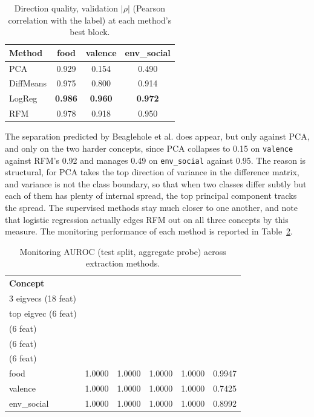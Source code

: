 \begin{table}[htbp]
\centering
\caption{Direction quality, validation $|\rho|$ (Pearson correlation with the label) at each method's best block.}
\label{tab:baselines_val_rho}
\begin{tabular}{@{}lccc@{}}
\toprule
\textbf{Method} & \textbf{food} & \textbf{valence} & \textbf{env\_social} \\
\midrule
PCA        & 0.929 & 0.154 & 0.490 \\
DiffMeans  & 0.975 & 0.800 & 0.914 \\
LogReg     & \textbf{0.986} & \textbf{0.960} & \textbf{0.972} \\
RFM        & 0.978 & 0.918 & 0.950 \\
\bottomrule
\end{tabular}
\end{table}

The separation predicted by Beaglehole et al. does appear, but only against PCA, and only
on the two harder concepts, since PCA collapses to 0.15 on \verb|valence| against RFM's
0.92 and manages 0.49 on \verb|env_social| against 0.95. The reason is structural, for PCA
takes the top direction of variance in the difference matrix, and variance is not the
class boundary, so that when two classes differ subtly but each of them has plenty of
internal spread, the top principal component tracks the spread. The supervised methods
stay much closer to one another, and note that logistic regression actually edges RFM out
on all three concepts by this measure. The monitoring performance of each method is
reported in Table~\ref{tab:baselines_auroc}.


\begin{table}[htbp]
  \centering
  \caption{Monitoring AUROC (test split, aggregate probe) across extraction methods.}
  \label{tab:baselines_auroc}
  \small
  \begin{tabular}{@{}lccccc@{}}
    \toprule
    \textbf{Concept} & \shortstack{\textbf{RFM}\\3 eigvecs (18 feat)} & \shortstack{\textbf{RFM}\\top eigvec (6 feat)} & \shortstack{\textbf{DiffMeans}\\(6 feat)} & \shortstack{\textbf{LogReg}\\(6 feat)} & \shortstack{\textbf{PCA}\\(6 feat)} \\
    \midrule
    food        & 1.0000 & 1.0000 & 1.0000 & 1.0000 & 0.9947 \\
    valence     & 1.0000 & 1.0000 & 1.0000 & 1.0000 & 0.7425 \\
    env\_social & 1.0000 & 1.0000 & 1.0000 & 1.0000 & 0.8992 \\
    \bottomrule
  \end{tabular}
\end{table}


